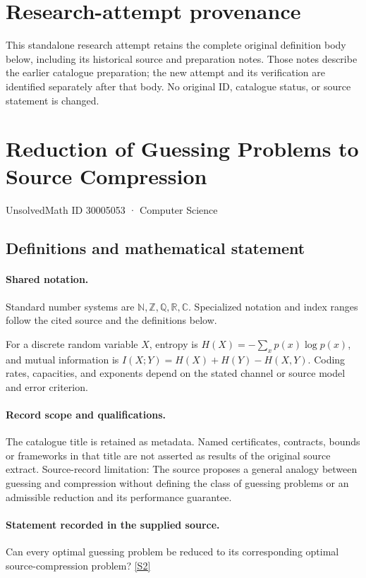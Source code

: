 \documentclass[11pt]{article}
\begin{document}
\section*{Research-attempt provenance}
This standalone research attempt retains the complete original definition body below,
including its historical source and preparation notes. Those notes describe the
earlier catalogue preparation; the new attempt and its verification are identified
separately after that body. No original ID, catalogue status, or source statement is changed.

\section{Reduction of Guessing Problems to Source Compression}\label{30005053}
{\small UnsolvedMath ID 30005053 · Computer Science}
\subsection{Definitions and mathematical statement}

\paragraph{Shared notation.}Standard number systems are $\mathbb N,\mathbb Z,\mathbb Q,\mathbb R,\mathbb C$. Specialized notation and index ranges follow the cited source and the definitions below.


For a discrete random variable $X$, entropy is $H(X)=-\sum_xp(x)\log p(x)$, and mutual information is $I(X;Y)=H(X)+H(Y)-H(X,Y)$. Coding rates, capacities, and exponents depend on the stated channel or source model and error criterion.
\paragraph{Record scope and qualifications.}
The catalogue title is retained as metadata. Named certificates, contracts, bounds or frameworks in that title are not asserted as results of the original source extract.
Source-record limitation: The source proposes a general analogy between guessing and compression without defining the class of guessing problems or an admissible reduction and its performance guarantee.
\paragraph{Statement recorded in the supplied source.}
Can every optimal guessing problem be reduced to its corresponding optimal source-compression problem? \href{https://doi.org/10.4171/owr/2022/14}{[S2]}
\end{document}
